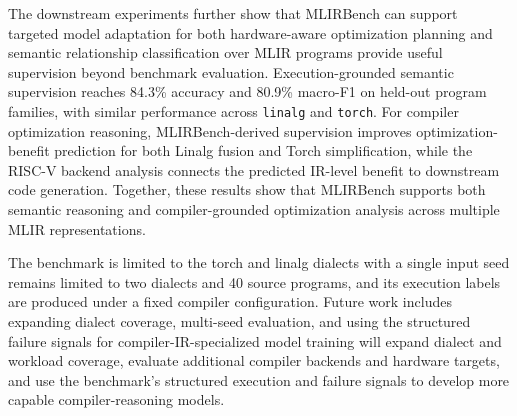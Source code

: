 \documentclass[sigplan,screen,review,anonymous]{acmart}
\providecommand{\DIFadd}[1]{{\protect\color{blue} \sf #1}} %
\providecommand{\DIFdel}[1]{{\protect\color{red} \scriptsize #1}} %
\providecommand{\DIFaddbegin}{} %
\providecommand{\DIFaddend}{} %
\providecommand{\DIFdelbegin}{} %
\providecommand{\DIFdelend}{} %
\begin{document}
\DIFadd{The downstream experiments further show }\DIFaddend that MLIRBench can \DIFdelbegin \DIFdel{support targeted model adaptation for both hardware-aware optimization planning and semantic relationship classification over MLIR programs}\DIFdelend \DIFaddbegin \DIFadd{provide useful
supervision beyond benchmark evaluation. Execution-grounded semantic
supervision reaches 84.3\% accuracy and 80.9\% macro-F1 on held-out program
families, with similar performance across \texttt{linalg} and \texttt{torch}.
For compiler optimization reasoning, MLIRBench-derived supervision improves
optimization-benefit prediction for both Linalg fusion and Torch
simplification, while the RISC-V backend analysis connects the predicted
IR-level benefit to downstream code generation. Together, these results show
that MLIRBench supports both semantic reasoning and compiler-grounded
optimization analysis across multiple MLIR representations}\DIFaddend .

The benchmark \DIFdelbegin \DIFdel{is limited to the torch and linalg dialects with a single input seed}\DIFdelend \DIFaddbegin \DIFadd{remains limited to two dialects and 40 source programs, and its
execution labels are produced under a fixed compiler configuration}\DIFaddend . Future
work \DIFdelbegin \DIFdel{includes expanding dialect coverage,
multi-seed evaluation, and using the structured failure signals for
compiler-IR-specialized model training}\DIFdelend \DIFaddbegin \DIFadd{will expand dialect and workload coverage, evaluate additional compiler
backends and hardware targets, and use the benchmark's structured execution
and failure signals to develop more capable compiler-reasoning models}\DIFaddend .



\end{document}
